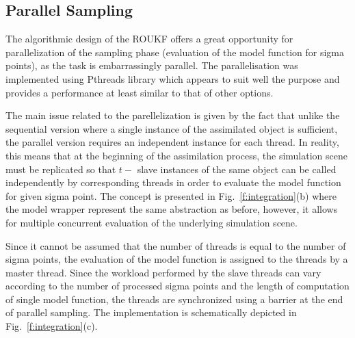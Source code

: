 \subsection{Parallel Sampling}
\label{si:parallel}
The algorithmic design of the ROUKF offers a great opportunity for parallelization of the sampling phase (evaluation of the model function 
for sigma points), as the task is embarrassingly parallel.
The parallelisation was implemented using Pthreads library which
appears to suit well the purpose and provides a performance at least similar to that of other options. 

The main issue related to the parellelization is given by the fact that unlike the sequential version where a single instance of the 
assimilated object is sufficient, the parallel version requires an independent instance for each thread. In reality, this 
means that at the beginning of the assimilation process, the simulation scene must be replicated so that $t-$ slave instances 
of the same object can be called independently by corresponding threads in order to evaluate the model function for given sigma point. 
The concept is presented in Fig.~\ref{f:integration}(b) where the model wrapper represent the same abstraction as before, however, it allows
 for multiple concurrent evaluation of the underlying simulation scene. 
 
 Since it cannot be assumed that the number of threads is equal to the number of sigma points, the evaluation of the model function 
 is assigned to the threads by a master thread. Since the workload performed by the slave threads can vary according to the number of
 processed sigma points and the length of computation of single model function, the threads are synchronized using a barrier at the end 
 of parallel sampling. The implementation is schematically depicted in Fig.~\ref{f:integration}(c). 








